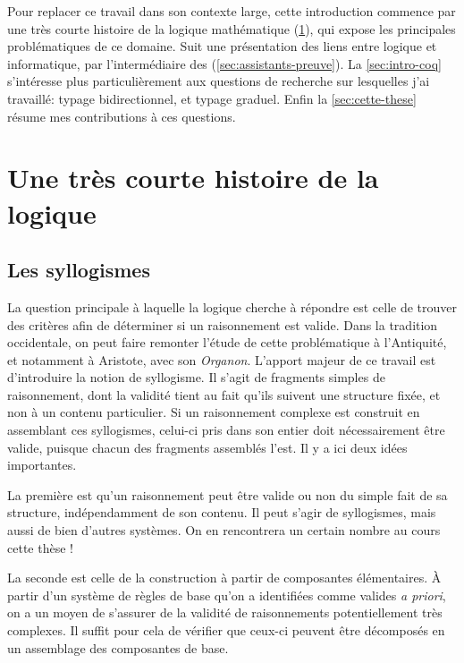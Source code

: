 Pour replacer ce travail dans son contexte large, cette introduction
commence par une très courte histoire de la logique mathématique
(\cref{sec:logique-histoire}), qui expose les principales problématiques de ce domaine.
Suit une présentation des liens entre logique et informatique, par
l’intermédiaire des  (\cref{sec:assistants-preuve}).
La \cref{sec:intro-coq} s’intéresse plus particulièrement aux questions
de recherche sur lesquelles j’ai travaillé: typage bidirectionnel,  et typage
graduel.
Enfin la \cref{sec:cette-these} résume mes contributions à ces questions.

\section{Une très courte histoire de la logique}
\label{sec:logique-histoire}

\subsection{Les syllogismes}

La question principale à laquelle la logique cherche à répondre
est celle de trouver des critères afin de déterminer si un raisonnement est valide.
Dans la tradition occidentale, on peut faire remonter l’étude de cette problématique
à l’Antiquité, et notamment à Aristote, avec son \textit{Organon}.
L’apport majeur de ce travail est d’introduire la notion de syllogisme.
Il s’agit de fragments simples de raisonnement, dont la validité tient au fait qu’ils
suivent une structure fixée, et non à un contenu particulier.%
Si un raisonnement complexe est construit en assemblant ces syllogismes,
celui-ci pris dans son entier doit nécessairement être valide, puisque
chacun des fragments assemblés l’est. Il y a ici deux idées importantes.

La première est qu'un raisonnement peut être valide ou non du simple fait de sa structure, indépendamment de son contenu.
Il peut s’agir de syllogismes, mais aussi de bien d’autres systèmes. On en rencontrera
un certain nombre au cours cette thèse !

La seconde est celle de la construction à partir de composantes élémentaires. À
partir d’un système de règles de base qu’on a identifiées comme valides 
\textit{a priori}, on a un moyen de s’assurer de la validité
de raisonnements potentiellement très complexes.
Il suffit pour cela de vérifier que ceux-ci peuvent être décomposés en un
assemblage des composantes de base.

